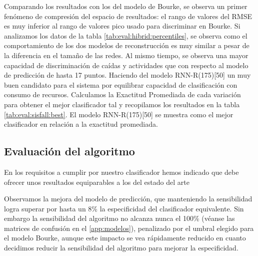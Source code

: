 Comparando los resultados con los del modelo de Bourke, se observa un primer fenómeno de compresión del espacio de resultados: el rango de valores del RMSE es muy inferior al rango de valores pico usado para discriminar en Bourke. Si analizamos los datos de la tabla \ref{tab:eval:hibrid:percentiles}, se observa como el comportamiento de los dos modelos de reconstrucción es muy similar a pesar de la diferencia en el tamaño de las redes. Al mismo tiempo, se observa una mayor capacidad de discriminación de caídas y actividades que con respecto al modelo de predicción de hasta 17 puntos.  Haciendo del modelo RNN-R(175)[50] un muy buen candidato para el sistema por equilibrar capacidad de clasificación con consumo de recursos. Calculamos la Exactitud Promediada de cada variación para obtener el mejor clasificador tal y recopilamos los resultados en la tabla \ref{tab:eval:sisfall:best}. El modelo RNN-R(175)[50] se muestra como el mejor clasificador en relación a la exactitud promediada.



\subsection{Evaluación del algoritmo}




En los requisitos a cumplir por nuestro clasificador hemos indicado que debe ofrecer unos resultados equiparables a los del estado del arte 



Observamos la mejora del modelo de predicción, que manteniendo la sensibilidad logra superar por hasta un 8\% la especificidad del clasificador equivalente. Sin embargo la sensibilidad del algoritmo no alcanza nunca el 100\% (véanse las matrices de confusión en el \autoref{app:modelos}), penalizado por el umbral elegido para el modelo Bourke, aunque este impacto se vea rápidamente reducido en cuanto decidimos reducir la sensibilidad del algoritmo para mejorar la especificidad.

